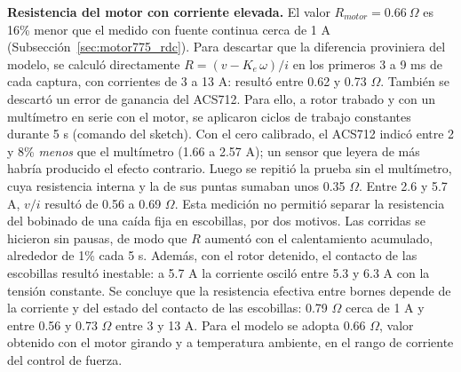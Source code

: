 \textbf{Resistencia del motor con corriente elevada.} El valor $R_{motor} = 0.66\ \Omega$ es 16\% menor que el medido con fuente continua cerca de 1 A (Subsección~\ref{sec:motor775_rdc}). Para descartar que la diferencia proviniera del modelo, se calculó directamente $R = (v - K_e\,\omega)/i$ en los primeros 3 a 9 ms de cada captura, con corrientes de 3 a 13 A: resultó entre 0.62 y 0.73 $\Omega$. También se descartó un error de ganancia del ACS712. Para ello, a rotor trabado y con un multímetro en serie con el motor, se aplicaron ciclos de trabajo constantes durante 5 s (comando  del sketch). Con el cero calibrado, el ACS712 indicó entre 2 y 8\% \emph{menos} que el multímetro (1.66 a 2.57 A); un sensor que leyera de más habría producido el efecto contrario. Luego se repitió la prueba sin el multímetro, cuya resistencia interna y la de sus puntas sumaban unos 0.35 $\Omega$. Entre 2.6 y 5.7 A, $v/i$ resultó de 0.56 a 0.69 $\Omega$. Esta medición no permitió separar la resistencia del bobinado de una caída fija en escobillas, por dos motivos. Las corridas se hicieron sin pausas, de modo que $R$ aumentó con el calentamiento acumulado, alrededor de 1\% cada 5 s. Además, con el rotor detenido, el contacto de las escobillas resultó inestable: a 5.7 A la corriente osciló entre 5.3 y 6.3 A con la tensión constante. Se concluye que la resistencia efectiva entre bornes depende de la corriente y del estado del contacto de las escobillas: 0.79 $\Omega$ cerca de 1 A y entre 0.56 y 0.73 $\Omega$ entre 3 y 13 A. Para el modelo se adopta 0.66 $\Omega$, valor obtenido con el motor girando y a temperatura ambiente, en el rango de corriente del control de fuerza.

